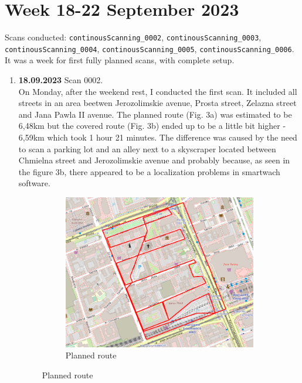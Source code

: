 \documentclass[a4paper,12pt]{book}
\begin{document}
\section{Week 18-22 September 2023}
Scans conducted: \verb|continousScanning_0002|, \verb|continousScanning_0003|, \verb|continousScanning_0004|, \verb|continousScanning_0005|, \verb|continousScanning_0006|.\\
It was a week for first fully planned scans, with complete setup. 
\begin{enumerate}
	\item \textbf{18.09.2023} Scan 0002. \\
	On Monday, after the weekend rest, I conducted the first scan. It included all streets in an area beetwen Jerozolimskie avenue, Prosta street, Zelazna street and Jana Pawla II avenue. The planned route (Fig. 3a) was estimated to be 6,48km but the covered route (Fig. 3b) ended up to be a little bit higher - 6,59km which took 1 hour 21 minutes. The difference was caused by the need to scan a parking lot and an alley next to a skyscraper located between Chmielna street and Jerozolimskie avenue and probably because, as seen in the figure 3b, there appeared to be a localization problems in smartwach software.
	\begin{figure}[H]
		\centering
		\begin{subfigure}{.90\textwidth}
			\centering
			\includegraphics[width=1\linewidth]{route_p2}
			\caption{Planned route}
			\label{fig:a2}
		\end{subfigure}%
		\linebreak

\end{figure}
\end{enumerate}
\end{document}
